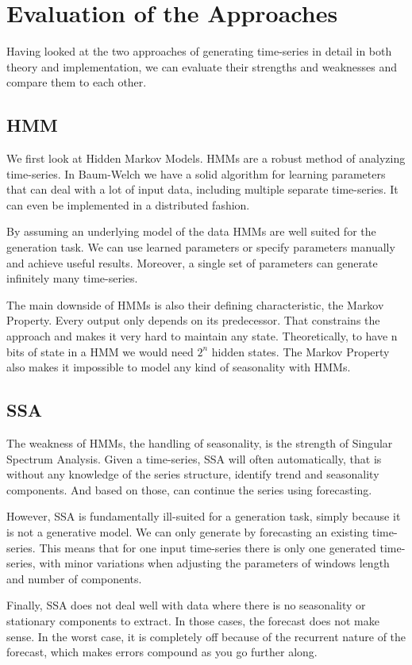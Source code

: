 
\chapter{Evaluation of the Approaches}\label{chapter:evaluation}

Having looked at the two approaches of generating time-series in detail in both theory and implementation, we can evaluate their strengths and weaknesses and compare them to each other. 

\section{HMM}

We first look at Hidden Markov Models. HMMs are a robust method of analyzing time-series. In Baum-Welch we have a solid algorithm for learning parameters that can deal with a lot of input data, including multiple separate time-series. It can even be implemented in a distributed fashion. 

By assuming an underlying model of the data HMMs are well suited for the generation task. We can use learned parameters or specify parameters manually and achieve useful results. Moreover, a single set of parameters can generate infinitely many time-series. 

The main downside of HMMs is also their defining characteristic, the Markov Property. Every output only depends on its predecessor. That constrains the approach and makes it very hard to maintain any state. Theoretically, to have n bits of state in a HMM we would need $2^n$ hidden states. The Markov Property also makes it impossible to model any kind of seasonality with HMMs. 

\section{SSA}

The weakness of HMMs, the handling of seasonality, is the strength of Singular Spectrum Analysis. Given a time-series, SSA will often automatically, that is without any knowledge of the series structure, identify trend and seasonality components. And based on those, can continue the series using forecasting.

However, SSA is fundamentally ill-suited for a generation task, simply because it is not a generative model. We can only generate by forecasting an existing time-series. This means that for one input time-series there is only one generated time-series, with minor variations when adjusting the parameters of windows length and number of components.

Finally, SSA does not deal well with data where there is no seasonality or stationary components to extract. In those cases, the forecast does not make sense. In the worst case, it is completely off because of the recurrent nature of the forecast, which makes errors compound as you go further along.